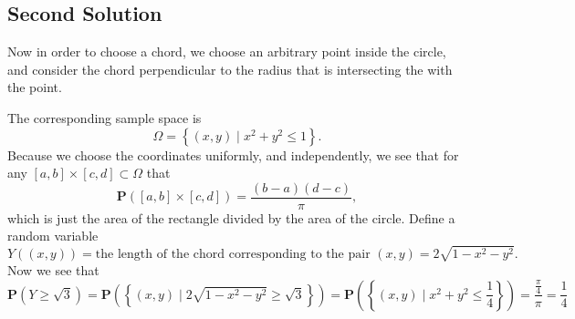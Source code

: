 \documentclass[11pt,a4paper]{article}
\theoremstyle{definition}
\theoremstyle{plain}
\newcommand{\Prob}{\mathbf{P}}
\newcommand{\set}[2]{ \left\{ #1 \mid #2 \right\} }
\begin{document}
  \subsection{Second Solution}
    Now in order to choose a chord, we choose an arbitrary point inside
    the circle, and consider the chord perpendicular to the radius that is
    intersecting the with the point.
    \begin{center}
    \end{center}
    The corresponding sample space is
    \[
      \Omega = \set{(x, y)}{ x^2 + y^2 \le 1}.
    \]
    Because we choose the coordinates uniformly, and independently, 
    we see that for any
    $[a,b] \times [c,d] \subset \Omega$ that
    \[
      \Prob([a,b] \times [c,d]) = \frac{(b-a)(d-c)}{\pi},
    \]
    which is just the area of the rectangle divided by the area of the circle.
    Define a random variable
    \[
      Y\left((x, y)\right) = \text{the length of the chord corresponding
      to the pair $(x, y)$} = 2 \sqrt{1 - x^2 - y^2}.
    \]
    Now we see that
    \[
      \Prob\left(Y \geq \sqrt{3}\right) = 
      \Prob\left(\set{(x,y)}{2 \sqrt{1 - x^2 - y^2} \geq \sqrt{3}}\right) =
      \Prob\left(\set{(x,y)}{x^2 + y^2 \le \frac{1}{4}}\right) =
      \frac{\frac{\pi}{4}}{\pi} =
      \frac{1}{4}
    \]
\end{document}

